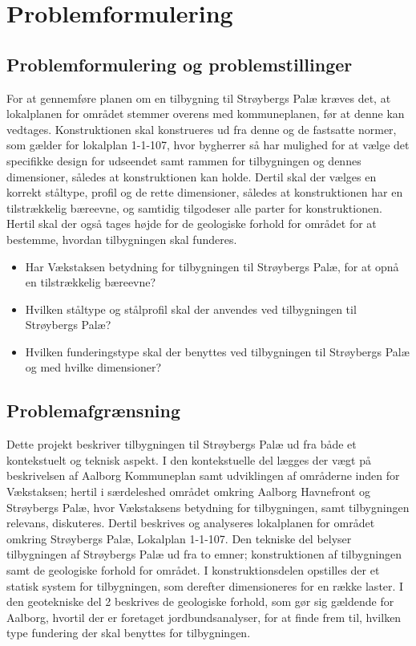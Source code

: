 \chapter{Problemformulering}

\section{Problemformulering og problemstillinger}
For at gennemføre planen om en tilbygning til Strøybergs Palæ kræves det, at lokalplanen for området stemmer overens med kommuneplanen, før at denne kan vedtages. Konstruktionen skal konstrueres ud fra denne og de fastsatte normer, som gælder for lokalplan 1-1-107, hvor bygherrer så har mulighed for at vælge det specifikke design for udseendet samt rammen for tilbygningen og dennes dimensioner, således at konstruktionen kan holde. Dertil skal der vælges en korrekt ståltype, profil og de rette dimensioner, således at konstruktionen har en tilstrækkelig bæreevne, og samtidig tilgodeser alle parter for konstruktionen. Hertil skal der også tages højde for de geologiske forhold for området for at bestemme, hvordan tilbygningen skal funderes. 


\begin{itemize} 
	\item Har Vækstaksen betydning for tilbygningen til Strøybergs Palæ, for at opnå en tilstrækkelig bæreevne?
	\item Hvilken ståltype og stålprofil skal der anvendes ved tilbygningen til Strøybergs Palæ? 
	\item Hvilken funderingstype skal der benyttes ved tilbygningen til Strøybergs Palæ og med hvilke dimensioner?
\end{itemize} 

\section{Problemafgrænsning}
Dette projekt beskriver tilbygningen til Strøybergs Palæ ud fra både et kontekstuelt og teknisk aspekt. I den kontekstuelle del lægges der vægt på beskrivelsen af Aalborg Kommuneplan samt udviklingen af områderne inden for Vækstaksen; hertil i særdeleshed området omkring Aalborg Havnefront og Strøybergs Palæ, hvor Vækstaksens betydning for tilbygningen, samt tilbygningen relevans, diskuteres. Dertil beskrives og analyseres lokalplanen for området omkring Strøybergs Palæ, Lokalplan 1-1-107.
\newline \indent{     }  Den tekniske del belyser tilbygningen af Strøybergs Palæ ud fra to emner; konstruktionen af tilbygningen samt de geologiske forhold for området. 
\newline \indent{     }  I konstruktionsdelen opstilles der et statisk system for tilbygningen, som derefter dimensioneres for en række laster. 
\newline \indent{     }  I den geotekniske del 2 beskrives de geologiske forhold, som gør sig gældende for Aalborg, hvortil der er foretaget jordbundsanalyser, for at finde frem til, hvilken type fundering der skal benyttes for tilbygningen.  